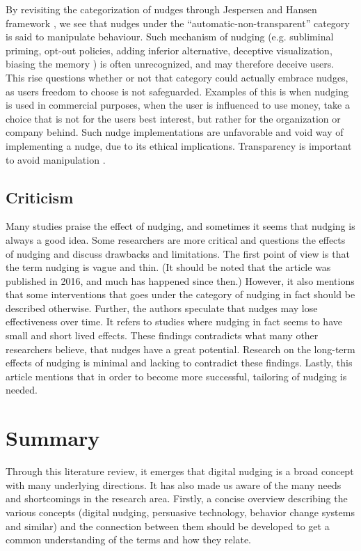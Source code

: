 By revisiting the categorization of nudges through Jespersen and Hansen framework 
\cite{hansen_nudge_2013}, we see that nudges under the “automatic-non-transparent” category is said to manipulate behaviour. Such mechanism of nudging (e.g. subliminal priming, opt-out policies, adding inferior alternative, deceptive visualization, biasing the memory \cite{caraban_23_2019}) is often unrecognized, and may therefore deceive users. This rise questions whether or not that category could actually embrace nudges, as users freedom to choose is not safeguarded. Examples of this is when nudging is used in commercial purposes, when the user is influenced to use money, take a choice that is not for the users best interest, but rather for the organization or company behind. Such nudge implementations are unfavorable and void way of implementing a nudge, due to its ethical implications. Transparency is important to avoid manipulation \cite{karlsen_recommendations_2019}. 

\subsection{Criticism }
Many studies praise the effect of nudging, and sometimes it seems that nudging is always a good idea. Some researchers \cite{matjasko_applying_2016}
are more critical and questions the effects of nudging and discuss drawbacks and limitations. The first point of view is that the term nudging is vague and thin. (It should be noted that the article was published in 2016, and much has happened since then.) However, it also mentions that some interventions that goes under the category of nudging in fact should be described otherwise. Further, the authors speculate that nudges may lose effectiveness over time. It refers to studies where nudging in fact seems to have small and short lived effects. These findings contradicts what many other researchers believe, that nudges have a great potential. Research on the long-term effects of nudging is minimal and lacking to contradict these findings. Lastly, this article mentions that in order to become more successful, tailoring of nudging is needed. 

\section{Summary}
Through this literature review, it emerges that digital nudging is a broad concept with many underlying directions. It has also made us aware of the many needs and shortcomings in the research area. Firstly, a concise overview describing the various concepts (digital nudging, persuasive technology, behavior change systems and similar) and the connection between them should be developed to get a common understanding of the terms and how they relate.

